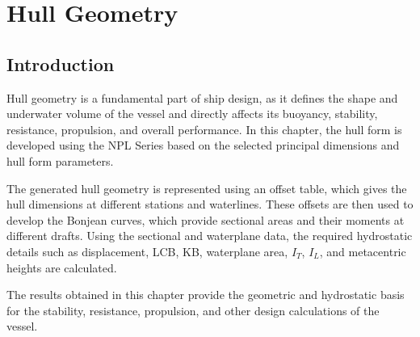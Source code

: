 \documentclass[12pt,a4paper,twoside]{report}
\begin{document}
\clearpage
\clearpage
\thispagestyle{empty}
\null
\newpage
\chapter{Hull Geometry}
\section{Introduction}

Hull geometry is a fundamental part of ship design, as it defines the shape and underwater volume of the vessel and directly affects its buoyancy, stability, resistance, propulsion, and overall performance. In this chapter, the hull form is developed using the NPL Series based on the selected principal dimensions and hull form parameters.
\vspace{\baselineskip}\par\noindent The generated hull geometry is represented using an offset table, which gives the hull dimensions at different stations and waterlines. These offsets are then used to develop the Bonjean curves, which provide sectional areas and their moments at different drafts. Using the sectional and waterplane data, the required hydrostatic details such as displacement, LCB, KB, waterplane area, \(I_T\), \(I_L\), and metacentric heights are calculated.
\vspace{\baselineskip}\par\noindent The results obtained in this chapter provide the geometric and hydrostatic basis for the stability, resistance, propulsion, and other design calculations of the vessel.
\end{document}

